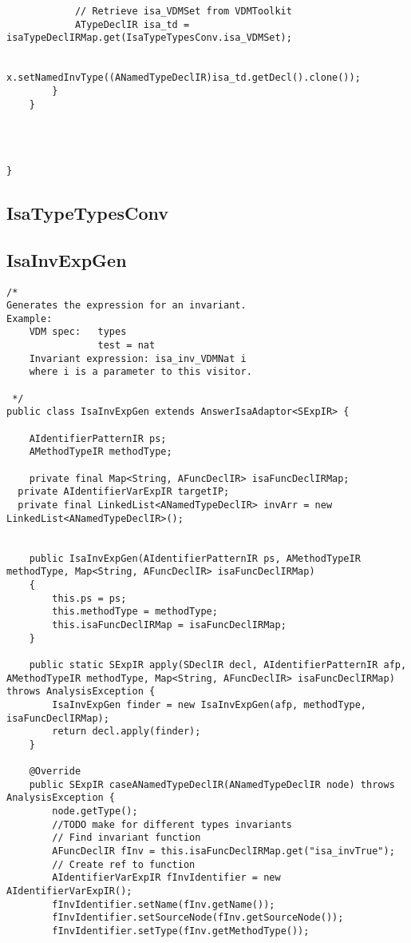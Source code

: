 \begin{appendices}
\begin{lstlisting}
            // Retrieve isa_VDMSet from VDMToolkit
            ATypeDeclIR isa_td = isaTypeDeclIRMap.get(IsaTypeTypesConv.isa_VDMSet);

            x.setNamedInvType((ANamedTypeDeclIR)isa_td.getDecl().clone());
        }
    }
    
    
    
    
}
\end{lstlisting}
\subsection{IsaTypeTypesConv} \label{IsaTypeTypesConv}

\subsection{IsaInvExpGen} \label{IsaInvExpGenafter}
\begin{lstlisting}
/*
Generates the expression for an invariant.
Example:
    VDM spec:   types
                test = nat
    Invariant expression: isa_inv_VDMNat i
    where i is a parameter to this visitor.

 */
public class IsaInvExpGen extends AnswerIsaAdaptor<SExpIR> {

    AIdentifierPatternIR ps;
    AMethodTypeIR methodType;
    
    private final Map<String, AFuncDeclIR> isaFuncDeclIRMap;
  private AIdentifierVarExpIR targetIP;
  private final LinkedList<ANamedTypeDeclIR> invArr = new LinkedList<ANamedTypeDeclIR>();


    public IsaInvExpGen(AIdentifierPatternIR ps, AMethodTypeIR methodType, Map<String, AFuncDeclIR> isaFuncDeclIRMap)
    {
        this.ps = ps;
        this.methodType = methodType;
        this.isaFuncDeclIRMap = isaFuncDeclIRMap;
    }

    public static SExpIR apply(SDeclIR decl, AIdentifierPatternIR afp, AMethodTypeIR methodType, Map<String, AFuncDeclIR> isaFuncDeclIRMap) throws AnalysisException {
        IsaInvExpGen finder = new IsaInvExpGen(afp, methodType, isaFuncDeclIRMap);
        return decl.apply(finder);
    }

    @Override
    public SExpIR caseANamedTypeDeclIR(ANamedTypeDeclIR node) throws AnalysisException {
        node.getType();
        //TODO make for different types invariants
        // Find invariant function
        AFuncDeclIR fInv = this.isaFuncDeclIRMap.get("isa_invTrue");
        // Create ref to function
        AIdentifierVarExpIR fInvIdentifier = new AIdentifierVarExpIR();
        fInvIdentifier.setName(fInv.getName());
        fInvIdentifier.setSourceNode(fInv.getSourceNode());
        fInvIdentifier.setType(fInv.getMethodType());


\end{lstlisting}
\end{appendices}
